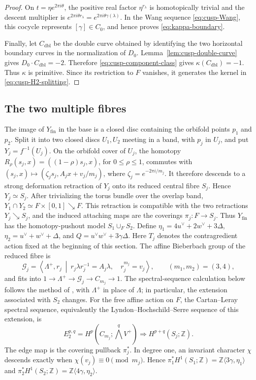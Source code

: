 \begin{proof}
On $t=\eta e^{2\pi i\theta}$, the positive real factor
$\eta^{r_\lambda}$ is homotopically trivial and the descent multiplier is
$e^{2\pi i\theta r_\lambda}=e^{2\pi i\theta\gamma(\lambda)}$.
In the Wang sequence \eqref{eq:cusp-Wang}, this cocycle represents
$[\gamma]\in C_0$, and hence proves
\eqref{eq:kappa-boundary}.

Finally, let $C_{\mathrm{dbl}}$ be the double curve obtained by identifying
the two horizontal boundary curves in the normalization of $D_0$.
Lemma~\ref{lem:cusp-double-curve} gives
$D_0\cdot C_{\mathrm{dbl}}=-2$.  Therefore
\eqref{eq:cusp-component-class} gives
$\kappa(C_{\mathrm{dbl}})=-1$.  Thus $\kappa$ is primitive.  Since its
restriction to $F$ vanishes, it generates the kernel in
\eqref{eq:cusp-H2-splitting}.
\end{proof}

\subsection{The two multiple fibres}

The image of $Y_{\mathrm{fin}}$ in the base is a closed disc containing
the orbifold points $p_1$ and $p_2$.  Split it into two closed discs
$U_1,U_2$ meeting in a band, with $p_j$ in
$U_j$, and put $Y_j=f^{-1}(U_j)$.  On the orbifold cover of
$U_j$, the homotopy
$R_\rho(s_j,x)=((1-\rho)s_j,x)$, for $0\leq\rho\leq1$,
commutes with
$(s_j,x)\mapsto(\zeta_js_j,A_jx+v_j/m_j)$, where
$\zeta_j=e^{-2\pi i/m_j}$.  It therefore descends to a
strong deformation retraction of $Y_j$ onto its reduced central fibre
$S_j$.  Hence
$Y_j\simeq S_j$.  After trivializing the torus bundle over the overlap
band, $Y_1\cap Y_2\simeq F\times[0,1]\searrow F$.
This retraction is compatible with the two retractions $Y_j\searrow S_j$,
and the induced attaching maps are the coverings
$\pi_j:F\to S_j$.  Thus $Y_{\mathrm{fin}}$ has the homotopy-pushout
model $S_1\cup_F S_2$.  Define
$\eta_1=4u^\vee+2w^\vee+3\Delta$,
$\eta_2=u^\vee+w^\vee+\Delta$, and
$Q=u^\vee w^\vee+3\gamma\Delta$.  Here $T_j$ denotes the
contragredient action fixed at the beginning of this section.
The affine Bieberbach group of the reduced fibre is
\[
 \mathcal G_j=
 \left\langle\Lambda^+,r_j\ \middle|\
 r_j\lambda r_j^{-1}=A_j\lambda,\quad r_j^{m_j}=v_j
 \right\rangle,
 \qquad (m_1,m_2)=(3,4),
\]
and fits into
$1\to\Lambda^+\to\mathcal G_j\to C_{m_j}\to1$.
The spectral-sequence calculation below follows the method of
\citep[Appendix~A, Lemma~A.4]{Alpoge2026}, with $\Lambda^+$ in place of
$\Lambda$; in particular, the extension associated with $S_2$ changes.
For the free affine action on $F$, the Cartan--Leray spectral sequence,
equivalently the Lyndon--Hochschild--Serre sequence of this extension, is
\begin{equation*}
 E_2^{p,q}=H^p\!\left(C_{m_j};\textstyle\bigwedge^qV^+\right)
 \Longrightarrow H^{p+q}(S_j;\mathbb Z).
\end{equation*}
The edge map is the covering pullback $\pi_j^*$.  In degree one, an
invariant character $\chi$ descends exactly when
$\chi(v_j)\equiv0\pmod{m_j}$.  Hence
$\pi_1^*H^1(S_1;\mathbb Z)=
\mathbb Z\langle3\gamma,\eta_1\rangle$ and
$\pi_2^*H^1(S_2;\mathbb Z)=
\mathbb Z\langle4\gamma,\eta_2\rangle$.

